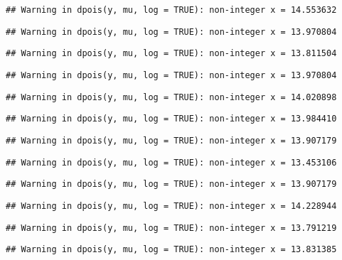 \documentclass[
]{article}
\begin{document}
\begin{verbatim}
## Warning in dpois(y, mu, log = TRUE): non-integer x = 14.553632
\end{verbatim}

\begin{verbatim}
## Warning in dpois(y, mu, log = TRUE): non-integer x = 13.970804
\end{verbatim}

\begin{verbatim}
## Warning in dpois(y, mu, log = TRUE): non-integer x = 13.811504
\end{verbatim}

\begin{verbatim}
## Warning in dpois(y, mu, log = TRUE): non-integer x = 13.970804
\end{verbatim}

\begin{verbatim}
## Warning in dpois(y, mu, log = TRUE): non-integer x = 14.020898
\end{verbatim}

\begin{verbatim}
## Warning in dpois(y, mu, log = TRUE): non-integer x = 13.984410
\end{verbatim}

\begin{verbatim}
## Warning in dpois(y, mu, log = TRUE): non-integer x = 13.907179
\end{verbatim}

\begin{verbatim}
## Warning in dpois(y, mu, log = TRUE): non-integer x = 13.453106
\end{verbatim}

\begin{verbatim}
## Warning in dpois(y, mu, log = TRUE): non-integer x = 13.907179
\end{verbatim}

\begin{verbatim}
## Warning in dpois(y, mu, log = TRUE): non-integer x = 14.228944
\end{verbatim}

\begin{verbatim}
## Warning in dpois(y, mu, log = TRUE): non-integer x = 13.791219
\end{verbatim}

\begin{verbatim}
## Warning in dpois(y, mu, log = TRUE): non-integer x = 13.831385
\end{verbatim}
\end{document}

